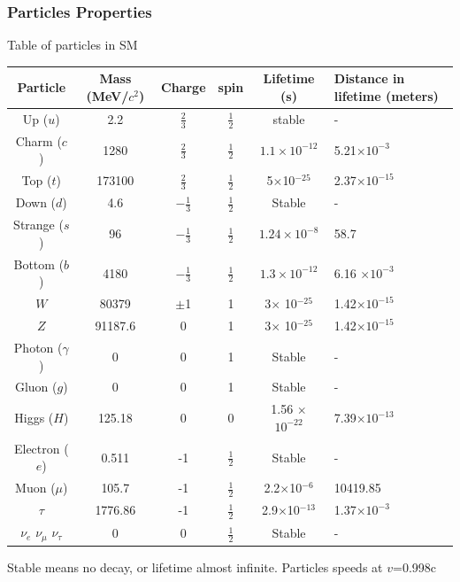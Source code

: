 \documentclass[11pt]{beamer}
\begin{document}
\begin{frame}
\frametitle{Particles Properties}
Table of particles in SM
\begin{table}
\tiny{\renewcommand{\arraystretch}{1.5}
\begin{tabular}{|c|c|c|c|c|p{2.5cm}|}
\hline 	
Particle	& Mass (MeV/$c^2$) &Charge & spin &Lifetime (s) & Distance in lifetime (meters) \\ 
\hline 
Up ($u$)	& 2.2 & $\frac{2}{3}$ & $\frac{1}{2}$ & stable & -\\ 
\hline 	
Charm ($c$)	& 1280 &$\frac{2}{3}$ & $\frac{1}{2}$ & $ 1.1 \times 10^{-12}$ & 5.21$\times 10^{-3}$ \\ 
\hline 
Top	($t$)& 173100 & $\frac{2}{3}$ & $\frac{1}{2}$ & 5$\times$10$^{-25}$ &2.37$\times 10^{-15}$  \\ 
\hline 
Down ($d$)	& 4.6 &$-\frac{1}{3}$ & $\frac{1}{2}$ & Stable & - \\ 
\hline 
Strange ($s$)	& 96 &$-\frac{1}{3}$ & $\frac{1}{2}$ &$1.24 \times 10^{-8}$ & 58.7 \\ 
\hline 
Bottom ($b$)	& 4180 &$-\frac{1}{3}$ & $\frac{1}{2}$ &$1.3 \times 10^{-12}$  & 6.16 $\times 10^{-3}$\\ 
\hline 
$W$ 	& 80379 &$\pm$1 & 1 & 3$\times$ 10$^{-25}$ & 1.42$\times 10^{-15}$\\ 
\hline 
$Z$ & 91187.6 &0 & 1 & 3$\times$ 10$^{-25}$ &1.42$\times 10^{-15}$ \\ 
\hline
Photon ($\gamma$) & 0 &0 & 1&Stable & - \\ 
\hline
Gluon ($g$)	& 0 &0 & 1&Stable & - \\ 
\hline 
Higgs ($H$)	& 125.18 &0 & 0& 1.56 $\times$ $10^{-22}$ & 7.39$\times 10^{-13}$ \\ 
\hline 
Electron ($e$)& 0.511 & -1 &  $\frac{1}{2}$& Stable & - \\ 
\hline 
Muon ($\mu$)	& 105.7 & -1 & $\frac{1}{2}$ & 2.2$\times$10$^{-6}$ & 10419.85 \\ 
\hline 
$\tau$	& 1776.86 &-1 & $\frac{1}{2}$ & 2.9$\times$10$^{-13}$ & 1.37$\times 10^{-3}$\\ 	
\hline 
$\nu_e$	$\nu_\mu$ $\nu_\tau$& 0 & 0 & $\frac{1}{2}$ & Stable & -\\
\hline 
\end{tabular} 
}
\end{table}
\tiny{Stable means no decay, or lifetime almost infinite. Particles speeds at $v$=0.998c}
\end{frame}
\end{document}
